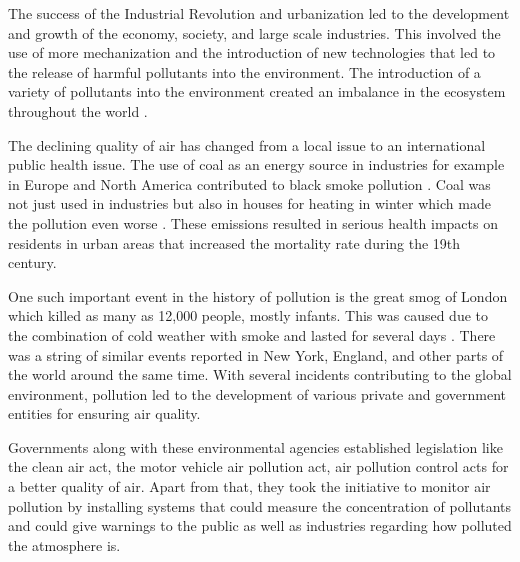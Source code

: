  The success of the Industrial Revolution and urbanization led to the development and growth of the economy, society, and large scale industries. This involved the use of more mechanization and the introduction of new technologies that led to the release of harmful pollutants into the environment. The introduction of a variety of pollutants into the environment created an imbalance in the ecosystem throughout the world \cite{manisalidis2020environmental}.
 
 The declining quality of air has changed from a local issue to an international public health issue. The use of coal as an energy source in industries for example in Europe and North America contributed to black smoke pollution \cite{heidorn1978chronology}. Coal was not just used in industries but also in houses for heating in winter which made the pollution even worse \cite{Al2016}. These emissions resulted in serious health impacts on residents in urban areas that increased the mortality rate during the 19th century. 
 \par
 One such important event in the history of pollution is the great smog of London which killed as many as 12,000 people, mostly infants. This was caused due to the combination of cold weather with smoke and lasted for several days \cite{wilkins1954air}. There was a string of similar events reported in New York, England, and other parts of the world around the same time. With several incidents contributing to the global environment, pollution led to the development of various private and government entities for ensuring air quality. 
 
 Governments along with these environmental agencies established legislation like the clean air act, the motor vehicle air pollution act, air pollution control acts for a better quality of air. Apart from that, they took the initiative to monitor air pollution by installing systems that could measure the concentration of pollutants and could give warnings to the public as well as industries regarding how polluted the atmosphere is.
 
